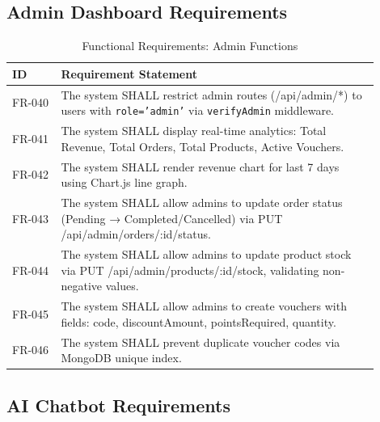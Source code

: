 \subsection{Admin Dashboard Requirements}

\begin{table}[H]
\centering
\caption{Functional Requirements: Admin Functions}
\label{tab:fr_admin}
\small
\begin{tabular}{@{}p{0.12\linewidth}p{0.78\linewidth}@{}}
\toprule
\textbf{ID} & \textbf{Requirement Statement} \\
\midrule
FR-040 & The system SHALL restrict admin routes (/api/admin/*) to users with \texttt{role='admin'} via \texttt{verifyAdmin} middleware. \\
FR-041 & The system SHALL display real-time analytics: Total Revenue, Total Orders, Total Products, Active Vouchers. \\
FR-042 & The system SHALL render revenue chart for last 7 days using Chart.js line graph. \\
FR-043 & The system SHALL allow admins to update order status (Pending → Completed/Cancelled) via PUT /api/admin/orders/:id/status. \\
FR-044 & The system SHALL allow admins to update product stock via PUT /api/admin/products/:id/stock, validating non-negative values. \\
FR-045 & The system SHALL allow admins to create vouchers with fields: code, discountAmount, pointsRequired, quantity. \\
FR-046 & The system SHALL prevent duplicate voucher codes via MongoDB unique index. \\
\bottomrule
\end{tabular}
\end{table}

\subsection{AI Chatbot Requirements}

